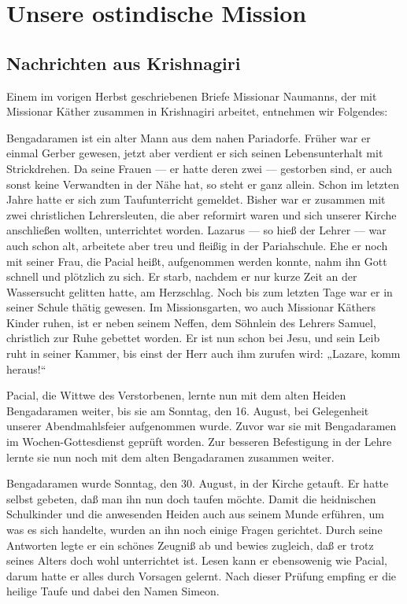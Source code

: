 \chapter{Unsere ostindische Mission}

\section{Nachrichten aus Krishnagiri}

Einem im vorigen Herbst geschriebenen Briefe Missionar Naumanns, der mit Missionar Käther zusammen in Krishnagiri arbeitet, entnehmen wir Folgendes:

Bengadaramen ist ein alter Mann aus dem nahen Pariadorfe. Früher war er einmal Gerber gewesen, jetzt aber verdient er sich seinen Lebensunterhalt mit Strickdrehen. Da seine Frauen — er hatte deren zwei — gestorben sind, er auch sonst keine Verwandten in der Nähe hat, so steht er ganz allein. Schon im letzten Jahre hatte er sich zum Taufunterricht gemeldet. Bisher war er zusammen mit zwei christlichen Lehrersleuten, die aber reformirt waren und sich unserer Kirche anschließen wollten, unterrichtet worden. Lazarus — so hieß der Lehrer — war auch schon alt, arbeitete aber treu und fleißig in der Pariahschule. Ehe er noch mit seiner Frau, die Pacial heißt, aufgenommen werden konnte, nahm ihn Gott schnell und plötzlich zu sich. Er starb, nachdem er nur kurze Zeit an der Wassersucht gelitten hatte, am Herzschlag. Noch bis zum letzten Tage war er in seiner Schule thätig gewesen. Im Missionsgarten, wo auch Missionar Käthers Kinder ruhen, ist er neben seinem Neffen, dem Söhnlein des Lehrers Samuel, christlich zur Ruhe gebettet worden. Er ist nun schon bei Jesu, und sein Leib ruht in seiner Kammer, bis einst der Herr auch ihm zurufen wird: „Lazare, komm heraus!“

Pacial, die Wittwe des Verstorbenen, lernte nun mit dem alten Heiden Bengadaramen weiter, bis sie am Sonntag, den 16. August, bei Gelegenheit unserer Abendmahlsfeier aufgenommen wurde. Zuvor war sie mit Bengadaramen im Wochen-Gottesdienst geprüft worden. Zur besseren Befestigung in der Lehre lernte sie nun noch mit dem alten Bengadaramen zusammen weiter.

Bengadaramen wurde Sonntag, den 30. August, in der Kirche getauft. Er hatte selbst gebeten, daß man ihn nun doch taufen möchte. Damit die heidnischen Schulkinder und die anwesenden Heiden auch aus seinem Munde erführen, um was es sich handelte, wurden an ihn noch einige Fragen gerichtet. Durch seine Antworten legte er ein schönes Zeugniß ab und bewies zugleich, daß er trotz seines Alters doch wohl unterrichtet ist. Lesen kann er ebensowenig wie Pacial, darum hatte er alles durch Vorsagen gelernt. Nach dieser Prüfung empfing er die heilige Taufe und dabei den Namen Simeon.

